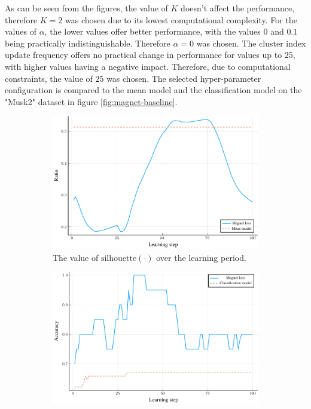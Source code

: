 As can be seen from the figures, the value of \( K \) doesn't affect the performance, therefore \( K = 2 \) was chosen due to its lowest computational complexity. For the values of \( \alpha \), the lower values offer better performance, with the values \( 0 \) and \( 0.1 \) being practically indistinguishable. Therefore \( \alpha = 0 \) was chosen. The cluster index update frequency offers no practical change in performance for values up to \( 25 \), with higher values having a negative impact. Therefore, due to computational constraints, the value of \( 25 \) was chosen. The selected hyper-parameter configuration is compared to the mean model and the classification model on the "Musk2" dataset in figure \ref{fig:magnet-baseline}.

\begin{figure}[h]
  \centering
  \begin{subfigure}[t]{0.49\textwidth}
    \centering
    \includegraphics[width=\textwidth]{images/magnet-baseline/ratio/magnet-baseline-ratio.pdf}
    \caption{The value of \( \mathrm{silhouette} \left( \cdot \right) \) over the learning period.}
  \end{subfigure}
  \hfill
  \begin{subfigure}[t]{0.49\textwidth}
    \centering
    \includegraphics[width=\textwidth]{images/magnet-baseline/accuracy/magnet-baseline-accuracy.pdf}

\end{subfigure}
\end{figure}
